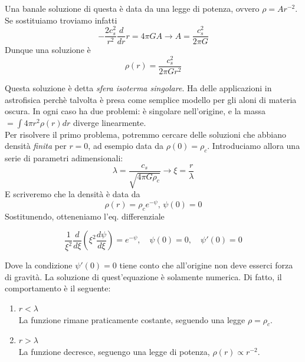 \documentclass{report}
\begin{document}
    Una banale soluzione di questa è data da una legge di potenza, ovvero $\rho = Ar^{-2}$. Se sostituiamo troviamo infatti 
    \begin{equation}
        -\frac{2c_s^2}{r^2}\frac{d}{dr}r = 4\pi G A \rightarrow A = \frac{c_s^2}{2\pi G}
    \end{equation}
    Dunque una soluzione è 
    \begin{equation}
        \rho(r) = \frac{c_s^2}{2\pi G r^2}
    \end{equation}

     Questa soluzione è detta \emph{sfera isoterma singolare}. Ha delle applicazioni in astrofisica perchè talvolta è presa come semplice modello per gli aloni di materia oscura. In ogni caso ha due problemi: è singolare nell'origine, e la massa $= \int 4\pi r^2 \rho(r)dr $ diverge linearmente. \\

     Per risolvere il primo problema, potremmo cercare delle soluzioni che abbiano densità \emph{finita} per $r=0$, ad esempio data da $\rho(0) = \rho_c$. Introduciamo allora una serie di parametri adimensionali: 
     \begin{equation}
         \lambda = \frac{c_s}{\sqrt{4\pi G \rho_c}} \rightarrow \xi = \frac{r}{\lambda}
     \end{equation}
     E scriveremo che la densità è data da 
     \begin{equation}
         \rho(r) = \rho_ce^{-\psi}, \, \psi(0) = 0 
     \end{equation}
     Sostitunendo, otteneniamo l'eq. differenziale 
     \begin{tcolorbox}[colback=myg!15, colframe=black, boxrule=1pt]
    \begin{equation}
        \label{isoterm_sfere}
        \frac{1}{\xi^2}\frac{d}{d\xi}\left(\xi^2\frac{d\psi}{d\xi} \right) = e^{-\psi}, \quad \psi(0)=0, \quad \psi'(0) = 0 
    \end{equation}
    \end{tcolorbox}

    Dove la condizione $\psi'(0) =0$ tiene conto che all'origine non deve esserci forza di gravità. La soluzione di quest'equazione è solamente numerica. Di fatto, il comportamento è il seguente: 
    \begin{enumerate}
        \item $r < \lambda$ \\
        La funzione rimane praticamente costante, seguendo una legge $\rho = \rho_c$. 
        \item $r > \lambda$ \\
        La funzione decresce, seguengo una legge di potenza, $\rho(r) \propto r^{-2}$. 
    \end{enumerate}
\end{document}
